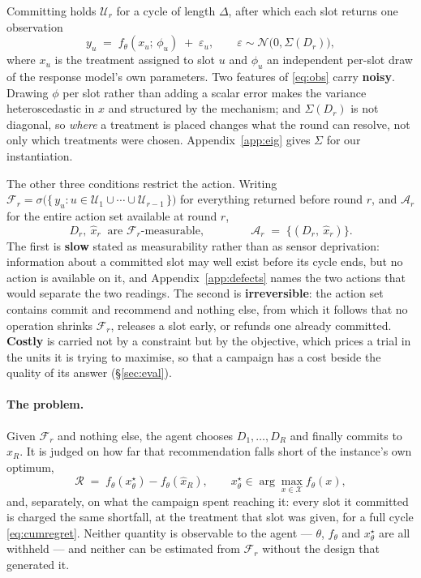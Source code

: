 Committing holds $\mathcal{U}_r$ for a cycle of length $\Delta$, after which each slot
returns one observation
\begin{equation}
  y_u \;=\; f_\theta\!\left(x_u;\, \phi_u\right) \;+\; \varepsilon_u,
  \qquad \varepsilon \sim \mathcal{N}\!\big(0, \Sigma(D_r)\big),
  \label{eq:obs}
\end{equation}
where $x_u$ is the treatment assigned to slot $u$ and $\phi_u$ an independent per-slot draw
of the response model's own parameters. Two features of \eqref{eq:obs} carry \textbf{noisy}.
Drawing $\phi$ per slot rather than adding a scalar error makes the variance heteroscedastic
in $x$ and structured by the mechanism; and $\Sigma(D_r)$ is not diagonal, so \emph{where} a
treatment is placed changes what the round can resolve, not only which treatments were
chosen. Appendix~\ref{app:eig} gives $\Sigma$ for our instantiation.

The other three conditions restrict the action. Writing $\mathcal{F}_r = \sigma\big(\{\,y_u
: u \in \mathcal{U}_1 \cup \cdots \cup \mathcal{U}_{r-1}\,\}\big)$ for everything returned
before round $r$, and $\mathcal{A}_r$ for the entire action set available at round $r$,
\begin{equation}
  D_r,\ \hat{x}_r \ \text{ are } \mathcal{F}_r\text{-measurable},
  \qquad\qquad
  \mathcal{A}_r \;=\; \big\{(D_r,\ \hat{x}_r)\big\}.
  \label{eq:action}
\end{equation}
The first is \textbf{slow} stated as measurability rather than as sensor deprivation:
information about a committed slot may well exist before its cycle ends, but no action is
available on it, and Appendix~\ref{app:defects} names the two actions that would separate
the two readings. The second is \textbf{irreversible}: the action set contains commit and
recommend and nothing else, from which it follows that no operation shrinks $\mathcal{F}_r$,
releases a slot early, or refunds one already committed. \textbf{Costly} is carried not by a
constraint but by the objective, which prices a trial in the units it is trying to maximise,
so that a campaign has a cost beside the quality of its answer (\S\ref{sec:eval}).

\paragraph{The problem.} Given $\mathcal{F}_r$ and nothing else, the agent chooses
$D_1, \dots, D_R$ and finally commits to $\hat{x}_R$. It is judged on how far that
recommendation falls short of the instance's own optimum,
\begin{equation}
  \mathcal{R} \;=\; f_\theta(x^\star_\theta) - f_\theta(\hat{x}_R),
  \qquad x^\star_\theta \in \arg\max_{x \in \mathcal{X}} f_\theta(x),
  \label{eq:problem}
\end{equation}
and, separately, on what the campaign spent reaching it: every slot it committed is charged
the same shortfall, at the treatment that slot was given, for a full cycle
\eqref{eq:cumregret}. Neither quantity
is observable to the agent --- $\theta$, $f_\theta$ and $x^\star_\theta$ are all withheld ---
and neither can be estimated from $\mathcal{F}_r$ without the design that generated it.

